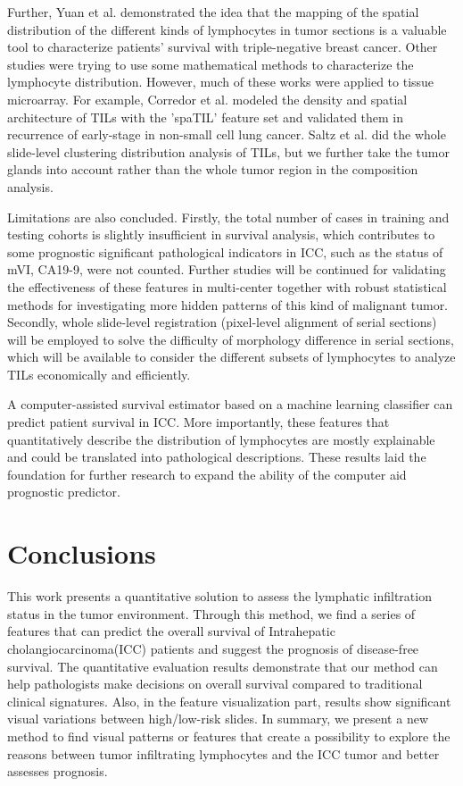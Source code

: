 \documentclass[num-refs]{wiley-article}
\begin{document}
Further, Yuan et al. \cite{yuan2015modelling} demonstrated the idea that the mapping of the spatial distribution of the different kinds of lymphocytes in tumor sections is a valuable tool to characterize patients' survival with triple-negative breast cancer. Other studies were trying to use some mathematical methods to characterize the lymphocyte distribution. However, much of these works were applied to tissue microarray. For example, Corredor et al. \cite{2013Spatial} modeled the density and spatial architecture of TILs with the 'spaTIL' feature set and validated them in recurrence of early-stage in non-small cell lung cancer. Saltz et al. \cite{saltz2018spatial}did the whole slide-level clustering distribution analysis of TILs, but we further take the tumor glands into account rather than the whole tumor region in the composition analysis.

Limitations are also concluded. Firstly, the total number of cases in training and testing cohorts is slightly insufficient in survival analysis, which contributes to some prognostic significant pathological indicators in ICC, such as the status of mVI, CA19-9, were not counted. Further studies will be continued for validating the effectiveness of these features in multi-center together with robust statistical methods for investigating more hidden patterns of this kind of malignant tumor. Secondly, whole slide-level registration (pixel-level alignment of serial sections) will be employed to solve the difficulty of morphology difference in serial sections, which will be available to consider the different subsets of lymphocytes to analyze TILs economically and efficiently. 

A computer-assisted survival estimator based on a machine learning classifier can predict patient survival in ICC. More importantly, these features that quantitatively describe the distribution of lymphocytes are mostly explainable and could be translated into pathological descriptions. These results laid the foundation for further research to expand the ability of the computer aid prognostic predictor. 

\section{Conclusions}\label{conclusion}
This work presents a quantitative solution to assess the lymphatic infiltration status in the tumor environment. Through this method, we find a series of features that can predict the overall survival of Intrahepatic cholangiocarcinoma(ICC) patients and suggest the prognosis of disease-free survival. The quantitative evaluation results demonstrate that our method can help pathologists make decisions on overall survival compared to traditional clinical signatures. Also, in the feature visualization part, results show significant visual variations between high/low-risk slides. In summary, we present a new method to find visual patterns or features that create a possibility to explore the reasons between tumor infiltrating lymphocytes and the ICC tumor and better assesses prognosis.
\end{document}
